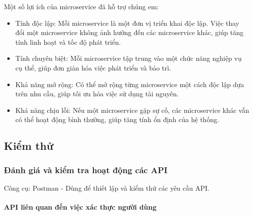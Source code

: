 Một số lợi ích của microservice đã hỗ trợ chúng em:
\begin{itemize}
	\item Tính độc lập: Mỗi microservice là một đơn vị triển khai độc lập. Việc thay đổi một microservice không ảnh hưởng đến các microservice khác, giúp tăng tính linh hoạt và tốc độ phát triển.
	\item Tính chuyên biệt: Mỗi microservice tập trung vào một chức năng nghiệp vụ cụ thể, giúp đơn giản hóa việc phát triển và bảo trì.
	\item Khả năng mở rộng: Có thể mở rộng từng microservice một cách độc lập dựa trên nhu cầu, giúp tối ưu hóa việc sử dụng tài nguyên.
	\item Khả năng chịu lỗi: Nếu một microservice gặp sự cố, các microservice khác vẫn có thể hoạt động bình thường, giúp tăng tính ổn định của hệ thống.
\end{itemize}

\subsection{Kiểm thử}

\subsubsection{Đánh giá và kiểm tra hoạt động các API}




Công cụ: Postman - Dùng để thiết lập và kiểm thử các yêu cầu API.

\paragraph{API liên quan đến việc xác thực người dùng}
\mbox{}



